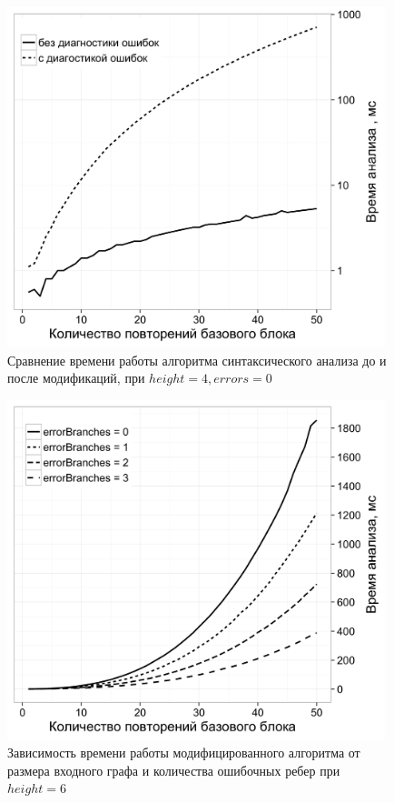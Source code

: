 \begin{figure}[h!]
 \centering
 \includegraphics[width=11cm]{pictures/compare_black.png}
 \caption{Сравнение времени работы алгоритма синтаксического анализа до и после модификаций, при $height=4, errors=0$}
 \label{compare}
\end{figure}
\begin{figure}[h!]
 \centering
 \includegraphics[width=11cm]{pictures/error_branches4_black.png}
 \caption{Зависимость времени работы модифицированного алгоритма от размера входного графа и количества ошибочных ребер при $height=6$}
 \label{withErrors}
\end{figure}
\clearpage